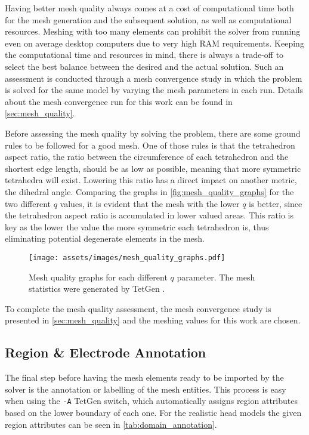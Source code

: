Having better mesh quality always comes at a cost of computational time both for the mesh generation and the subsequent solution, as well as computational resources. Meshing with too many elements can prohibit the solver from running even on average desktop computers due to very high \gls{RAM} requirements. Keeping the computational time and resources in mind, there is always a trade-off to select the best balance between the desired and the actual solution. Such an assessment is conducted through a mesh convergence study in which the problem is solved for the same model by varying the mesh parameters in each run. Details about the mesh convergence run for this work can be found in \ref{sec:mesh_quality}.

Before assessing the mesh quality by solving the problem, there are some ground rules to be followed for a good mesh. One of those rules is that the \gls{tetrahedron aspect ratio}, the ratio between the circumference of each tetrahedron and the shortest edge length, should be as low as possible, meaning that more symmetric tetrahedra will exist. Lowering this ratio has a direct impact on another metric, the dihedral angle. Comparing the graphs in \autoref{fig:mesh_quality_graphs} for the two different $q$ values, it is evident that the mesh with the lower $q$ is better, since the \gls{tetrahedron aspect ratio} is accumulated in lower valued areas. This ratio is key as the lower the value the more symmetric each tetrahedron is, thus eliminating potential degenerate elements in the mesh.

\begin{figure}[H]
    \centering
    \texttt{[image: assets/images/mesh\_quality\_graphs.pdf]}
    \caption[Mesh quality graphs for each different $q$ parameter]{Mesh quality graphs for each different $q$ parameter. The mesh statistics were generated by TetGen \cite{tetgen}.}
    \label{fig:mesh_quality_graphs}
\end{figure}

To complete the mesh quality assessment, the mesh convergence study is presented in \autoref{sec:mesh_quality} and the meshing values for this work are chosen.

\subsection{Region \& Electrode Annotation}
\label{subsec:elec_annotation}

The final step before having the mesh elements ready to be imported by the solver is the annotation or labelling of the mesh entities. This process is easy when using the \texttt{-A} TetGen \cite{tetgen} switch, which automatically assigns region attributes based on the lower boundary of each one. For the realistic head models the given region attributes can be seen in \autoref{tab:domain_annotation}.

